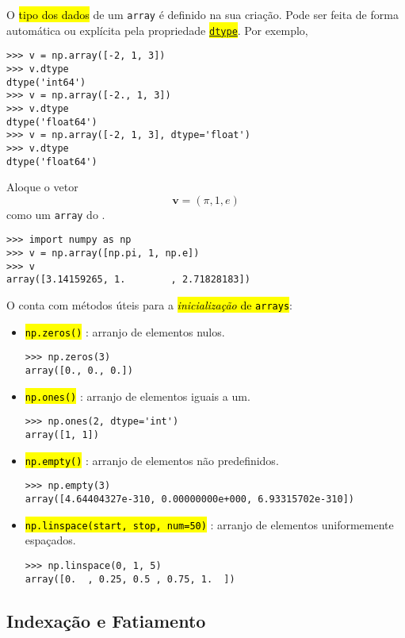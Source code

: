 O \hl{tipo dos dados} de um \lstinline+array+ é definido na sua criação. Pode ser feita de forma automática ou explícita pela propriedade \hl{{\href{https://numpy.org/doc/stable/reference/arrays.dtypes.html}{\lstinline+dtype+}}}. Por exemplo,
\begin{lstlisting}
>>> v = np.array([-2, 1, 3])
>>> v.dtype
dtype('int64')
>>> v = np.array([-2., 1, 3])
>>> v.dtype
dtype('float64')
>>> v = np.array([-2, 1, 3], dtype='float')
>>> v.dtype
dtype('float64')
\end{lstlisting}

\begin{ex}
  Aloque o vetor
  \begin{equation}
    \pmb{v} = (\pi, 1, e)
  \end{equation}
  como um \lstinline+array+ do {\numpy}.
\begin{lstlisting}
>>> import numpy as np
>>> v = np.array([np.pi, 1, np.e])
>>> v
array([3.14159265, 1.        , 2.71828183])
\end{lstlisting}
\end{ex}

O {\numpy} conta com métodos úteis para a \hl{\emph{inicialização} de {\lstinline+arrays+}}:
\begin{itemize}
\item \hl{{\lstinline+np.zeros()+}} : arranjo de elementos nulos.
\begin{lstlisting}
>>> np.zeros(3)
array([0., 0., 0.])
\end{lstlisting}
\item \hl{{\lstinline+np.ones()+}} : arranjo de elementos iguais a um.
\begin{lstlisting}
>>> np.ones(2, dtype='int')
array([1, 1])
\end{lstlisting}
\item \hl{{\lstinline+np.empty()+}} : arranjo de elementos não predefinidos.
\begin{lstlisting}
>>> np.empty(3)
array([4.64404327e-310, 0.00000000e+000, 6.93315702e-310])
\end{lstlisting}
\item \hl{{\lstinline+np.linspace(start, stop, num=50)+}} : arranjo de elementos uniformemente espaçados.
\begin{lstlisting}
>>> np.linspace(0, 1, 5)
array([0.  , 0.25, 0.5 , 0.75, 1.  ])
\end{lstlisting}
\end{itemize}

\subsection{Indexação e Fatiamento}

